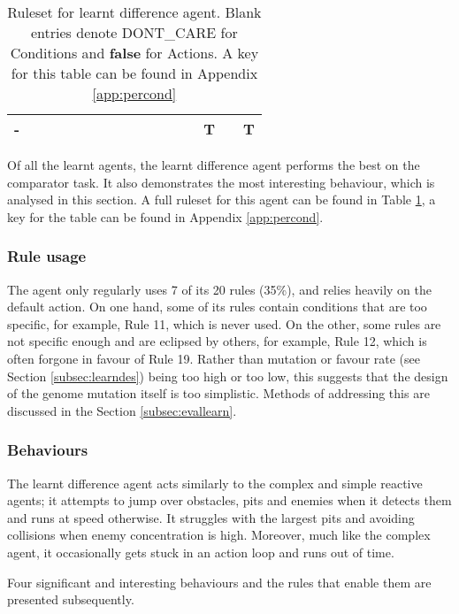 \begin{table}[!t]
\begin{adjustwidth}{-2cm}{-2cm}
\begin{center}
\begin{tabular}{ | c | c | c | c | c | c | c | c | c | c | c | c || c | c | c | c |}
	-  & & & & & & & & & & & 		& & T & & T \\ \hline
    \end{tabular}
  \end{center}
  \end{adjustwidth}
  \caption{Ruleset for learnt difference agent. Blank entries denote {\scriptsize DONT\_CARE} for Conditions and \textbf{false} for Actions. A key for this table can be found in Appendix \ref{app:percond}}
  \label{tab:LDA}
\end{table}

Of all the learnt agents, the learnt difference agent performs the best on the comparator task. It also demonstrates the most interesting behaviour, which is analysed in this section. A full ruleset for this agent can be found in Table \ref{tab:LDA}, a key for the table can be found in Appendix \ref{app:percond}.

\subsubsection{Rule usage}

The agent only regularly uses 7 of its 20 rules (35\%), and relies heavily on the default action. On one hand, some of its rules contain conditions that are too specific, for example, Rule 11, which is never used. On the other, some rules are not specific enough and are eclipsed by others, for example, Rule 12, which is often forgone in favour of Rule 19. Rather than mutation or favour rate (see Section \ref{subsec:learndes}) being too high or too low, this suggests that the design of the genome mutation itself is too simplistic. Methods of addressing this are discussed in the Section \ref{subsec:evallearn}.

\subsubsection{Behaviours}

The learnt difference agent acts similarly to the complex and simple reactive agents; it attempts to jump over obstacles, pits and enemies when it detects them and runs at speed otherwise. It struggles with the largest pits and avoiding collisions when enemy concentration is high. Moreover, much like the complex agent, it occasionally gets stuck in an action loop and runs out of time.

Four significant and interesting behaviours and the rules that enable them are presented subsequently. 


